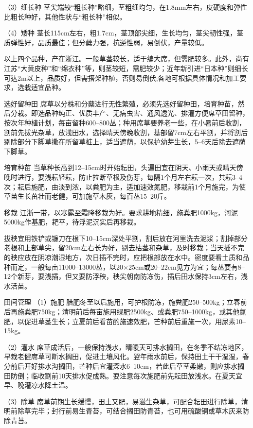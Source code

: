 \documentclass{ctexbook}
\begin{document}
（3）细长种 茎尖端较“粗长种”略细，茎粗细均匀，在1.8mm左右，皮硬度和弹性比粗长种好，其他性状与“粗长种”相似。

（4）矮种 茎长115cm左右，粗1.7cm，茎顶部尖细，生长均匀，茎尖韧性强，茎质弹性好，品质最佳；但分蘖力强，抗逆性弱，易倒伏，产量较低。

以上四个品种，产在浙江。一般草茎较长，适于编大席，但需肥较多。此外，尚有江苏“大黄皮种”和“绵衣种”等，则茎较短，需肥较少；近年新引进“日本种”则细长可达2m以上，品质好，但需搭架种植，否则易倒伏;各地可根据具体情况和加工要求，选栽适宜品种。

选好留种田 席草以分株和分蘖进行无性繁殖，必须先选好留种田，培育种苗，然后分栽。即选品种纯正、优质丰产、无病虫害、通风透光、排灌方便席草田留种，按次年种植计划，每亩留种600--800丛；种用席草要养老一些，在小暑前后收割，割前先拔光杂草，放浅田水，选择晴天傍晚收割，基部留7cm左右平割，并将割后剔除部分下脚草撒在所留草桩上，适当遮荫，以保护幼芽生长，5--6天后除去遮荫下脚草。

培育种苗 当草种长高到12--15cm时开始耘田，头遍田宜在阴天、小雨天或晴天傍晚时进行，要浅耘轻耘，防止拉断草根及伤芽，每隔1个月左右耘一次，共耘3--4次；耘后施肥，由淡到浓，以粪肥为主，适加速效氮肥，移栽前1个月施完，为使草苗生长茁壮而老健，可加施草木灰，每百丛15--20斤。

移栽 江浙一带，以寒露至霜降移栽为好。要求耕地精细，施粪肥1000kg，河泥5000kg作基肥，耙平，待浮泥沉实后再移栽。

拔秧宜用铁铲或镰刀在根下10--15cm深处平割，割后放在河里洗去泥浆；割掉部分老根和上部草尖，留20cm左右长为好，剔去枯茎和杂草，及时移栽；当天插不完的秧应放在阴凉潮湿地方，次日插不完时，应把根部放在水中。密度要看土质和品种而定，一般每亩11000--13000丛，以20$\times$25cm或20--22cm见方为宜；每丛要有8--12个新芽，要浅插，但又要防浮秧，秧尖朝南防冻伤，插后田水保持3cm左右，浅水活苗。

田间管理
（1）施肥 腊肥冬至以后施用，可护根防冻，施粪肥250--500kg；立春前后再施粪肥750kg；清明前后每亩施用绿肥2500kg、或粪肥750--1000kg，或其他氮肥，以促进草茎生长；立夏前后看苗酌施速效肥，芒种前后重施一次，用尿素10--15kg。

（2）灌水 席草成活后，一般保持浅水，晴暖天可排水搁田，在冬季不结冻地区，早栽老健席草可断水搁田，促进土壤风化。翌年雨水前后，保持田土干干湿湿，春分前后开好排水沟搁田，芒种后宜灌深水6--10cm，若此后草茎柔嫩，则应排水搁田防倒；临收割前10天排水促成熟。耍注意每次施肥前先耘田放浅水。在夏天宜早、晚灌凉水降土温。

（3）除草 席草前期生长缓慢，田土又肥，易滋生杂草，可配合耘田进行除草，清明前除草完毕；封行前易生青苔，可结合搁田防青苔，也可用硫酸铜或草木灰来防除青苔。
\end{document}
